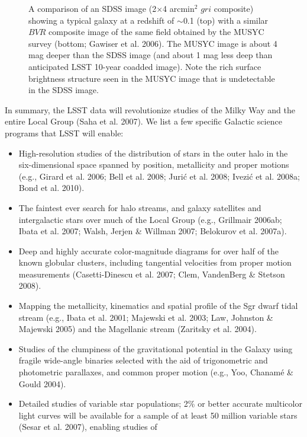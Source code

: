 \documentclass{emulateapj}
\begin{document}
\begin{figure}
\vskip -1in
\caption{
A comparison of an SDSS image (2$\times$4 arcmin$^2$ $gri$ composite) showing a typical galaxy at 
a redshift of $\sim$0.1 (top) with a similar $BVR$ composite image of the same field obtained by the MUSYC survey (bottom; 
Gawiser et al. 2006). The MUSYC image is about 4 mag deeper than the SDSS image (and about 1 mag less deep 
than anticipated LSST 10-year coadded image). Note the rich surface brightness structure seen in the MUSYC 
image that is undetectable in the SDSS image.} 
\label{Fig:musyc}
\end{figure}


In summary, the LSST data will revolutionize studies of the Milky Way and the entire
Local Group (Saha et al. 2007). We list a few specific Galactic science programs that 
LSST will enable: 

\begin{itemize} 
\item High-resolution studies of the distribution of stars in the outer halo
      in the six-dimensional space spanned by position, metallicity and proper
      motions (e.g., Girard et al. 2006; Bell et al. 2008; Juri\'{c} et al. 2008;
      Ivezi\'{c} et al. 2008a; Bond et al. 2010).
\item The faintest ever search for halo streams, and galaxy satellites and intergalactic stars 
      over much of the Local Group (e.g., Grillmair 2006ab; Ibata et al. 2007; Walsh, 
      Jerjen \& Willman 2007; Belokurov et al. 2007a).
\item Deep and highly accurate color-magnitude diagrams for over half of the known 
      globular clusters, including tangential velocities from proper motion 
      measurements (Casetti-Dinescu et al. 2007; Clem, VandenBerg \& Stetson 2008). 
\item Mapping the metallicity, kinematics and spatial profile of the Sgr dwarf tidal 
      stream (e.g., Ibata et al. 2001; Majewski et al. 2003; Law, Johnston \& Majewski 2005)
       and the Magellanic stream (Zaritsky et al. 2004). 
\item Studies of the clumpiness of the gravitational potential in the Galaxy using 
      fragile wide-angle binaries selected with the aid of trigonometric and 
      photometric parallaxes, and common proper motion (e.g., Yoo, Chanam\'{e} \& Gould 2004).
\item Detailed studies of variable star populations; 2\% or better accurate 
      multicolor light curves will be available for a sample of at least 50 
      million variable stars (Sesar et al. 2007), enabling studies of

\end{itemize}
\end{document}
